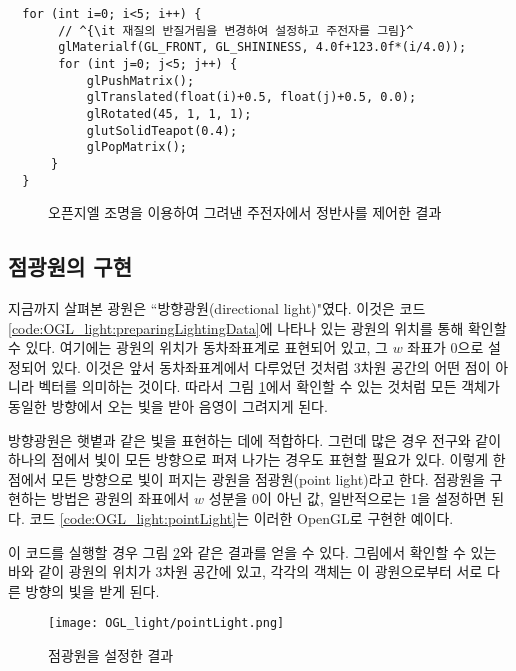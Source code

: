 \begin{algorithmbis}\label{code:OGL_light:specularControl}
\lstset{language=C++, escapechar=^} 
\begin{lstlisting}
  for (int i=0; i<5; i++) {
       // ^{\it 재질의 반질거림을 변경하여 설정하고 주전자를 그림}^
       glMaterialf(GL_FRONT, GL_SHININESS, 4.0f+123.0f*(i/4.0)); 
       for (int j=0; j<5; j++) {
           glPushMatrix();
           glTranslated(float(i)+0.5, float(j)+0.5, 0.0);
           glRotated(45, 1, 1, 1);
           glutSolidTeapot(0.4);
           glPopMatrix();
      }
  }
\end{lstlisting}
\end{algorithmbis}

\begin{figure}[h!]
  \centering
    \caption{오픈지엘 조명을 이용하여 그려낸 주전자에서 정반사를 제어한 결과}
    \label{fig:OGL_light:specularControl}
\end{figure}

\subsection{점광원의 구현}

지금까지 살펴본 광원은 ``방향광원(directional light)"였다.
이것은 코드 \ref{code:OGL_light:preparingLightingData}에 나타나 있는 광원의 위치를 통해 확인할 수 있다.
여기에는 광원의 위치가 동차좌표계로 표현되어 있고, 그 $w$ 좌표가 0으로 설정되어 있다.
이것은 앞서 동차좌표계에서 다루었던 것처럼 3차원 공간의 어떤 점이 아니라 벡터를 의미하는 것이다.
따라서 그림 \ref{fig:OGL_light:specularControl}에서 확인할 수 있는 것처럼 모든 객체가 동일한 방향에서 오는 빛을 받아
음영이 그려지게 된다.

방향광원은 햇볕과 같은 빛을 표현하는 데에 적합하다. 그런데 많은 경우 전구와 같이 하나의 점에서 빛이 모든 방향으로 퍼져 나가는
경우도 표현할 필요가 있다. 이렇게 한 점에서 모든 방향으로 빛이 퍼지는 광원을 점광원(point light)라고 한다.
점광원을 구현하는 방법은 광원의 좌표에서 $w$ 성분을 0이 아닌 값, 일반적으로는 1을 설정하면 된다.
코드 \ref{code:OGL_light:pointLight}는 이러한 OpenGL로 구현한 예이다.

이 코드를 실행할 경우 그림 \ref{fig:OGL_light:pointLight}와 같은 결과를 얻을 수 있다. 그림에서 확인할 수 있는 바와 같이
광원의 위치가 3차원 공간에 있고, 각각의 객체는 이 광원으로부터 서로 다른 방향의 빛을 받게 된다.

\begin{figure}[h!]
  \centering
    \texttt{[image: OGL\_light/pointLight.png]}
    \caption{점광원을 설정한 결과}
    \label{fig:OGL_light:pointLight}
\end{figure}

